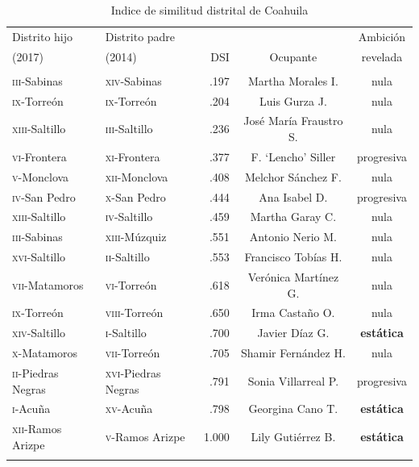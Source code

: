 \documentclass[letter,12pt]{article}
\begin{document}
\begin{table}
  \centering
\begin{tabular}{llrcc}
 Distrito hijo               &  Distrito padre             &       &          & Ambición  \\ [-.5ex]
 (2017)                      &  (2014)                     &  DSI  & Ocupante & revelada \\ \hline
\\ [-1.2ex]
 \textsc{iii}-Sabinas        & \textsc{xiv}-Sabinas        &  .197 & Martha Morales I.      & nula         \\ 
 \textsc{ix}-Torreón         & \textsc{ix}-Torreón         &  .204 & Luis Gurza J.          & nula         \\ 
 \textsc{xiii}-Saltillo      & \textsc{iii}-Saltillo       &  .236 & José María Fraustro S. & nula         \\ 
 \textsc{vi}-Frontera        & \textsc{xi}-Frontera        &  .377 & F. `Lencho' Siller     & progresiva   \\ 
 \textsc{v}-Monclova         & \textsc{xii}-Monclova       &  .408 & Melchor Sánchez F.     & nula         \\ 
 \textsc{iv}-San Pedro       & \textsc{x}-San Pedro        &  .444 & Ana Isabel D.          & progresiva   \\ 
 \textsc{xiii}-Saltillo      & \textsc{iv}-Saltillo        &  .459 & Martha Garay C.        & nula         \\ 
 \textsc{iii}-Sabinas        & \textsc{xiii}-Múzquiz       &  .551 & Antonio Nerio M.       & nula         \\ 
 \textsc{xvi}-Saltillo       & \textsc{ii}-Saltillo        &  .553 & Francisco Tobías H.    & nula         \\ 
 \textsc{vii}-Matamoros      & \textsc{vi}-Torreón         &  .618 & Verónica Martínez G.   & nula         \\ 
 \textsc{ix}-Torreón         & \textsc{viii}-Torreón       &  .650 & Irma Castaño O.        & nula         \\ 
 \textsc{xiv}-Saltillo       & \textsc{i}-Saltillo         &  .700 & Javier Díaz G.         & \textbf{estática}     \\ 
 \textsc{x}-Matamoros        & \textsc{vii}-Torreón        &  .705 & Shamir Fernández H.    & nula         \\ 
 \textsc{ii}-Piedras Negras  & \textsc{xvi}-Piedras Negras &  .791 & Sonia Villarreal P.    & progresiva   \\ 
 \textsc{i}-Acuña            & \textsc{xv}-Acuña           &  .798 & Georgina Cano T.       & \textbf{estática}     \\ 
 \textsc{xii}-Ramos Arizpe   & \textsc{v}-Ramos Arizpe     & 1.000 & Lily Gutiérrez B.      & \textbf{estática}     \\ \\ [-1.2ex] \hline
\end{tabular}
\caption{Indice de similitud distrital de Coahuila}\label{T:dsi}
\end{table}
\end{document}

